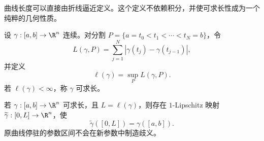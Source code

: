 曲线长度可以直接由折线逼近定义。这个定义不依赖积分，并使可求长性成为一个纯粹的几何性质。

\begin{definition}[可求长曲线]\label{def:2-4-3-3}
设 $\gamma:[a,b]\to\R^n$ 连续。对分割
$P=\{a=t_0<t_1<\cdots<t_N=b\}$，令
\[
 L(\gamma,P)=\sum_{j=1}^N|\gamma(t_j)-\gamma(t_{j-1})|,
\]
并定义
\[
 \ell(\gamma)=\sup_P L(\gamma,P).
 \tag{2.4.23}\label{eq:curve-length-partitions}
\]
若 $\ell(\gamma)<\infty$，称 $\gamma$ 可求长。
\end{definition}

\begin{proposition}[弧长参数化]\label{proposition:2-4-3-arclength-param}
若 $\gamma:[a,b]\to\R^n$ 可求长，且 $L=\ell(\gamma)$，则存在
$1$-Lipschitz 映射 $\widetilde\gamma:[0,L]\to\R^n$，使
\[
 \widetilde\gamma([0,L])=\gamma([a,b]).
\]
原曲线停驻的参数区间不会在新参数中制造歧义。
\end{proposition}


